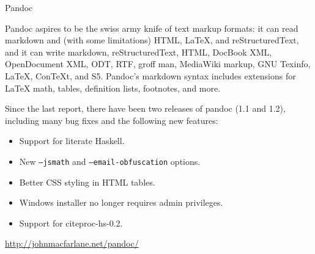 \begin{hcarentry}[updated]{Pandoc}
\label{pandoc}
\makeheader

Pandoc aspires to be the swiss army knife of text markup formats: it
can read markdown and (with some limitations) HTML, LaTeX, and
reStructuredText, and it can write markdown, reStructuredText, HTML,
DocBook XML, OpenDocument XML, ODT, RTF, groff man, MediaWiki markup,
GNU Texinfo, LaTeX, ConTeXt, and S5.  Pandoc's markdown syntax includes
extensions for LaTeX math, tables, definition lists, footnotes, and more.

Since the last report, there have been two releases of pandoc (1.1 and 1.2),
including many bug fixes and the following new features:
\begin{itemize}
  \item Support for literate Haskell.
  \item New \texttt{--jsmath} and \texttt{--email-obfuscation} options.
  \item Better CSS styling in HTML tables.
  \item Windows installer no longer requires admin privileges.
  \item Support for citeproc-hs-0.2.
\end{itemize}

\FurtherReading
    \url{http://johnmacfarlane.net/pandoc/}
\end{hcarentry}
